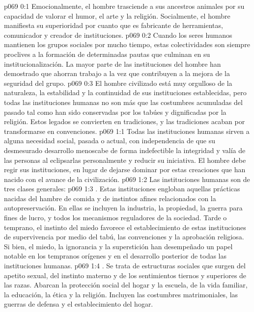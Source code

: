 \author{Melquisedec}
\vs p069 0:1 Emocionalmente, el hombre trasciende a sus ancestros animales por su capacidad de valorar el humor, el arte y la religión. Socialmente, el hombre manifiesta su superioridad por cuanto que es fabricante de herramientas, comunicador y creador de instituciones.
\vs p069 0:2 Cuando los seres humanos mantienen los grupos sociales por mucho tiempo, estas colectividades son siempre proclives a la formación de determinadas pautas que culminan en su institucionalización. La mayor parte de las instituciones del hombre han demostrado que ahorran trabajo a la vez que contribuyen a la mejora de la seguridad del grupo.
\vs p069 0:3 El hombre civilizado está muy orgulloso de la naturaleza, la estabilidad y la continuidad de sus instituciones establecidas, pero todas las instituciones humanas no son más que las costumbres acumuladas del pasado tal como han sido conservadas por los tabúes y dignificadas por la religión. Estos legados se convierten en tradiciones, y las tradiciones acaban por transformarse en convenciones.
\vs p069 1:1 Todas las instituciones humanas sirven a alguna necesidad social, pasada o actual, con independencia de que su desmesurado desarrollo menoscabe de forma indefectible la integridad y valía de las personas al eclipsarlas personalmente y reducir su iniciativa. El hombre debe regir sus instituciones, en lugar de dejarse dominar por estas creaciones que han nacido con el avance de la civilización.
\vs p069 1:2 \pc Las instituciones humanas son de tres clases generales:
\vs p069 1:3 . Estas instituciones engloban aquellas prácticas nacidas del hambre de comida y de instintos afines relacionados con la autopreservación. En ellas se incluyen la industria, la propiedad, la guerra para fines de lucro, y todos los mecanismos reguladores de la sociedad. Tarde o temprano, el instinto del miedo favorece el establecimiento de estas instituciones de supervivencia por medio del tabú, las convenciones y la aprobación religiosa. Si bien, el miedo, la ignorancia y la superstición han desempeñado un papel notable en los tempranos orígenes y en el desarrollo posterior de todas las instituciones humanas.
\vs p069 1:4 . Se trata de estructuras sociales que surgen del apetito sexual, del instinto materno y de los sentimientos tiernos y superiores de las razas. Abarcan la protección social del hogar y la escuela, de la vida familiar, la educación, la ética y la religión. Incluyen las costumbres matrimoniales, las guerras de defensa y el establecimiento del hogar.
